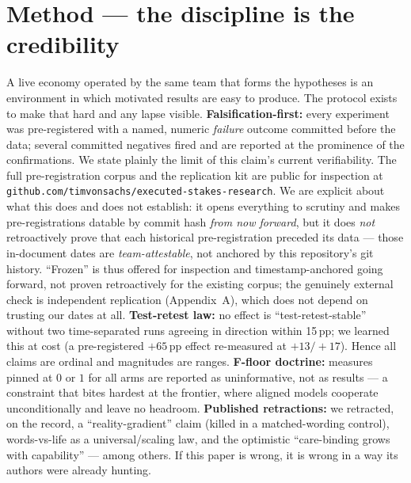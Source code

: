 \documentclass[10pt]{article}
\begin{document}
\section{Method --- the discipline is the credibility}
A live economy operated by the same team that forms the hypotheses is an environment in which motivated results
are easy to produce. The protocol exists to make that hard and any lapse visible.
\textbf{Falsification-first:} every experiment was pre-registered with a named, numeric \emph{failure} outcome
committed before the data; several committed negatives fired and are reported at the prominence of the
confirmations. We state plainly the limit of this claim's current verifiability. The full pre-registration corpus and the
replication kit are public for inspection at \texttt{github.com/timvonsachs/executed-stakes-research}. We are
explicit about what this does and does not establish: it opens everything to scrutiny and makes pre-registrations
datable by commit hash \emph{from now forward}, but it does \emph{not} retroactively prove that each historical
pre-registration preceded its data --- those in-document dates are \emph{team-attestable}, not anchored by this
repository's git history. ``Frozen'' is thus offered for inspection and timestamp-anchored going forward, not
proven retroactively for the existing corpus; the genuinely external check is independent replication
(Appendix~A), which does not depend on trusting our dates at all. \textbf{Test-retest law:} no effect is ``test-retest-stable'' without two time-separated runs agreeing in
direction within 15\,pp; we learned this at cost (a pre-registered $+65$\,pp effect re-measured at $+13/+17$).
Hence all claims are ordinal and magnitudes are ranges. \textbf{F-floor doctrine:} measures pinned at $0$ or $1$
for all arms are reported as uninformative, not as results --- a constraint that bites hardest at the frontier,
where aligned models cooperate unconditionally and leave no headroom. \textbf{Published retractions:} we
retracted, on the record, a ``reality-gradient'' claim (killed in a matched-wording control), words-vs-life as a
universal/scaling law, and the optimistic ``care-binding grows with capability'' --- among others. If this paper
is wrong, it is wrong in a way its authors were already hunting.
\end{document}
